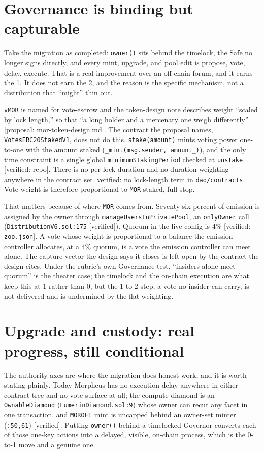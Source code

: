 \documentclass[11pt,a4paper]{article}
\newcommand{\code}[1]{\texttt{\small #1}}
\newcommand{\pv}[1]{{\color{muted}\sffamily\scriptsize[#1]}}
\begin{document}
\section{Governance is binding but capturable}

Take the migration as completed: \code{owner()} sits behind the timelock, the Safe
no longer signs directly, and every mint, upgrade, and pool edit is propose, vote,
delay, execute. That is a real improvement over an off-chain forum, and it earns
the 1. It does not earn the 2, and the reason is the specific mechanism, not a
distribution that ``might'' thin out.

\code{vMOR} is named for vote-escrow and the token-design note describes weight
``scaled by lock length,'' so that ``a long holder and a mercenary one weigh
differently'' \pv{proposal: mor-token-design.md}. The contract the proposal names,
\code{VotesERC20StakedV1}, does not do this. \code{stake(amount)} mints voting
power one-to-one with the amount staked (\code{\_mint(msg.sender, amount\_)}), and
the only time constraint is a single global \code{minimumStakingPeriod} checked at
\code{unstake} \pv{verified: repo}. There is no per-lock duration and no
duration-weighting anywhere in the contract set \pv{verified: no lock-length term
in \code{dao/contracts}}. Vote weight is therefore proportional to \code{MOR}
staked, full stop.

That matters because of where \code{MOR} comes from. Seventy-six percent of
emission is assigned by the owner through \code{manageUsersInPrivatePool}, an
\code{onlyOwner} call (\code{DistributionV6.sol:175} \pv{verified}). Quorum in the
live config is 4\% \pv{verified: \code{zoo.json}}. A vote whose weight is
proportional to a balance the emission controller allocates, at a 4\% quorum, is a
vote the emission controller can meet alone. The capture vector the design says it
closes is left open by the contract the design cites. Under the rubric's own
Governance test, ``insiders alone meet quorum'' is the theater case; the timelock
and the on-chain execution are what keep this at 1 rather than 0, but the 1-to-2
step, a vote no insider can carry, is not delivered and is undermined by the flat
weighting.

\section{Upgrade and custody: real progress, still conditional}

The authority axes are where the migration does honest work, and it is worth
stating plainly. Today Morpheus has no execution delay anywhere in either contract
tree and no vote surface at all; the compute diamond is an \code{OwnableDiamond}
(\code{LumerinDiamond.sol:9}) whose owner can recut any facet in one transaction,
and \code{MOROFT} mint is uncapped behind an owner-set minter (\code{:50,61})
\pv{verified}. Putting \code{owner()} behind a timelocked Governor converts each of
those one-key actions into a delayed, visible, on-chain process, which is the
0-to-1 move and a genuine one.
\end{document}
